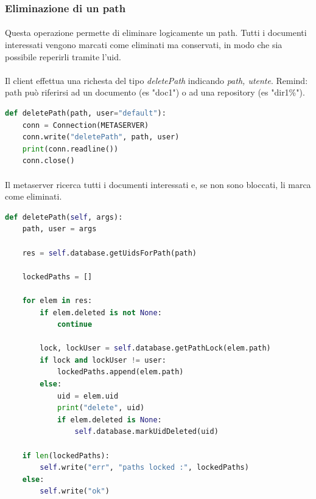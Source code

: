 \documentclass[11pt,a4paper,english]{article}
\begin{document}
\subsubsection{Eliminazione di un path}

\paragraph{} Questa operazione permette di eliminare logicamente un path. Tutti i documenti interessati vengono marcati come eliminati ma conservati, in modo che sia possibile reperirli tramite l'uid.

\paragraph{} Il client effettua una richesta del tipo \emph{deletePath} indicando \emph{path, utente}. Remind: path può riferirsi ad un documento (es "doc1") o ad una repository (es "dir1\%"). 

\begin{lstlisting}[language=Python, title=Client]
def deletePath(path, user="default"):
    conn = Connection(METASERVER)
    conn.write("deletePath", path, user)
    print(conn.readline())
    conn.close()
\end{lstlisting}

\paragraph{} Il metaserver ricerca tutti i documenti interessati e, se non sono bloccati, li marca come eliminati. 

\begin{lstlisting}[language=Python, title=Metaserver]
def deletePath(self, args):
    path, user = args

    res = self.database.getUidsForPath(path)

    lockedPaths = []

    for elem in res:
        if elem.deleted is not None:
            continue

        lock, lockUser = self.database.getPathLock(elem.path)
        if lock and lockUser != user:
            lockedPaths.append(elem.path)
        else:
            uid = elem.uid
            print("delete", uid)
            if elem.deleted is None:
                self.database.markUidDeleted(uid)

    if len(lockedPaths):
        self.write("err", "paths locked :", lockedPaths)
    else:
        self.write("ok")
\end{lstlisting}
\end{document}
